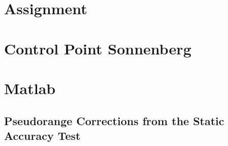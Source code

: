 \chapter{Assignment}\label{appendix:assignment}




\chapter{Control Point Sonnenberg}\label{appendix:control_point_sonnenberg}




\chapter{Matlab}\label{appendix:matlab_code}

\section{Pseudorange Corrections from the Static Accuracy Test}



